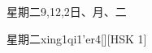 \begin{entry}{星期二}{9,12,2}{⽇、⽉、⼆}
  \begin{phonetics}{星期二}{xing1qi1'er4}[][HSK 1]
  \end{phonetics}
\end{entry}
